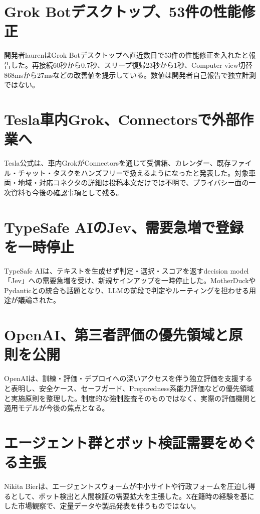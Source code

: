 \section{Grok Botデスクトップ、53件の性能修正}
開発者laurenはGrok Botデスクトップへ直近数日で53件の性能修正を入れたと報告した。再接続60秒から0.7秒、スリープ復帰23秒から1秒、Computer view切替868msから27msなどの改善値を提示している。数値は開発者自己報告で独立計測ではない。

\section{Tesla車内Grok、Connectorsで外部作業へ}
Tesla公式は、車内GrokがConnectorsを通じて受信箱、カレンダー、既存ファイル・チャット・タスクをハンズフリーで扱えるようになったと発表した。対象車両・地域・対応コネクタの詳細は投稿本文だけでは不明で、プライバシー面の一次資料も今後の確認事項として残る。

\section{TypeSafe AIのJev、需要急増で登録を一時停止}
TypeSafe AIは、テキストを生成せず判定・選択・スコアを返すdecision model「Jev」への需要急増を受け、新規サインアップを一時停止した。MotherDuckやPydanticとの統合も話題となり、LLMの前段で判定やルーティングを担わせる用途が議論された。

\section{OpenAI、第三者評価の優先領域と原則を公開}
OpenAIは、訓練・評価・デプロイへの深いアクセスを伴う独立評価を支援すると表明し、安全ケース、セーフガード、Preparedness系能力評価などの優先領域と実施原則を整理した。制度的な強制監査そのものではなく、実際の評価機関と適用モデルが今後の焦点となる。

\section{エージェント群とボット検証需要をめぐる主張}
Nikita Bierは、エージェントスウォームが中小サイトや行政フォームを圧迫し得るとして、ボット検出と人間検証の需要拡大を主張した。X在籍時の経験を基にした市場観察で、定量データや製品発表を伴うものではない。

